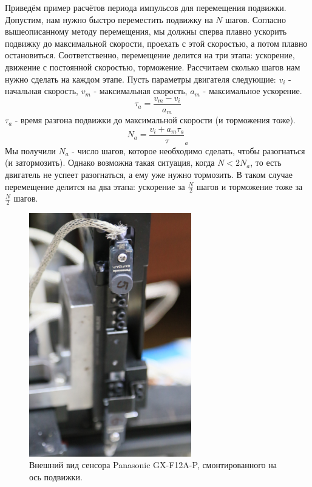 \documentclass[14pt,russian,a4paper]{extarticle}
\newcounter{subsubsubsection}[subsubsection]
\begin{document}
Приведём пример расчётов периода импульсов для перемещения подвижки.
Допустим, нам нужно быстро переместить подвижку на $N$ шагов. Согласно вышеописанному методу перемещения, мы должны сперва плавно ускорить подвижку до максимальной скорости, проехать с этой скоростью, а потом плавно остановиться. Соответственно, перемещение делится на три этапа: ускорение, движение с постоянной скоростью, торможение. Рассчитаем сколько шагов нам нужно сделать на каждом этапе. Пусть параметры двигателя следующие: $v_i$ - начальная скорость, $v_m$ - максимальная скорость, $a_m$ - максимальное ускорение.
\newline
$$
\tau_a = \frac{v_m - v_i}{a_m}
$$
$\tau_a$ - время разгона подвижки до максимальной скорости (и торможения тоже).
$$
N_a = \frac{v_i + a_m \tau_a} \tau_a
$$
Мы получили $N_a$ - число шагов, которое необходимо сделать, чтобы разогнаться (и затормозить). Однако возможна такая ситуация, когда $N < 2 N_a$, то есть двигатель не успеет разогнаться, а ему уже нужно тормозить. В таком случае перемещение делится на два этапа: ускорение за $\frac{N}{2}$ шагов и торможение тоже за $\frac{N}{2}$ шагов.


\begin{figure}[h!]
    \centerline{\includegraphics[width=200pt]{media/sensor_mounted.jpg}}
    \caption{Внешний вид сенсора Panasonic GX-F12A-P, смонтированного на ось подвижки.}
    \label{fig:sensor_mounted}
\end{figure}
\end{document}
